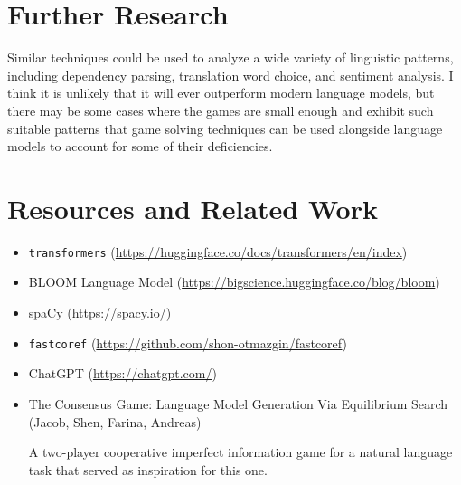 \documentclass[11pt]{article}
\begin{document}
    \section{Further Research}\label{sec:further-research}

    Similar techniques could be used to analyze a wide variety of linguistic patterns,
    including dependency parsing, translation word choice, and sentiment analysis.
    I think it is unlikely that it will ever outperform modern language models,
    but there may be some cases where the games are small enough
    and exhibit such suitable patterns that game solving techniques can
    be used alongside language models to account for some of their deficiencies.


    \section{Resources and Related Work}\label{sec:resources-and-related-work}

    \begin{itemize}
        \item
        \texttt{transformers} (\url{https://huggingface.co/docs/transformers/en/index})

        \item
        BLOOM Language Model (\url{https://bigscience.huggingface.co/blog/bloom})

        \item
        spaCy (\url{https://spacy.io/})

        \item
        \texttt{fastcoref} (\url{https://github.com/shon-otmazgin/fastcoref})

        \item
        ChatGPT (\url{https://chatgpt.com/})

        \item
        The Consensus Game: Language Model Generation Via Equilibrium Search
        (Jacob, Shen, Farina, Andreas)

        A two-player cooperative imperfect information game for a natural language task
        that served as inspiration for this one.
    \end{itemize}
\end{document}
